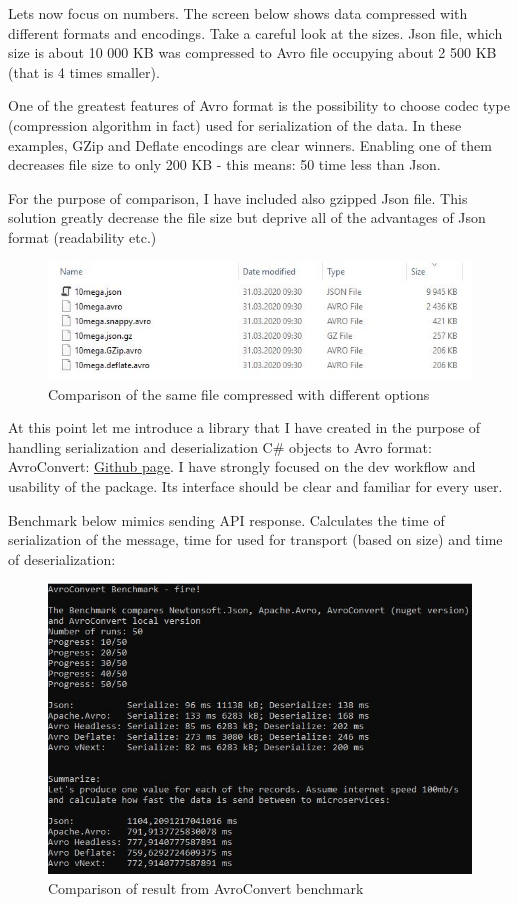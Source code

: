 \documentclass[]{article}
\begin{document}
Lets now focus on numbers. The screen below shows data compressed with different formats and encodings. Take a careful look at the sizes. Json file, which size is about 10 000 KB was compressed to Avro file occupying about 2 500 KB (that is 4 times smaller). 

One of the greatest features of Avro format is the possibility to choose codec type (compression algorithm in fact) used for serialization of the data. In these examples, GZip and Deflate encodings are clear winners. Enabling one of them decreases file size to only 200 KB - this means: 50 time less than Json.

For the purpose of comparison, I have included also gzipped Json file. This solution greatly decrease the file size but deprive all of the advantages of Json format (readability etc.)

\begin{figure}[H]
	\centering
	\includegraphics[width=\textwidth]{size_comparison}
	\caption{Comparison of the same file compressed with different options}
\end{figure}

At this point let me introduce a library that I have created in the purpose of handling serialization and deserialization C\# objects to Avro format: AvroConvert: 
\href{https://github.com/AdrianStrugala/AvroConvert}{Github page}.
I have strongly focused on the dev workflow and usability of the package. Its interface should be clear and familiar for every user.   

Benchmark below mimics sending API response. Calculates the time of serialization of the message, time for used for transport (based on size) and time of deserialization:  

\begin{figure}[H]
	\centering
	\includegraphics[width=\textwidth]{benchmark}
	\caption{Comparison of result from AvroConvert benchmark}
\end{figure}
\end{document}
